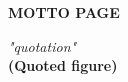 \clearpage
{}
{}

\begin{center}
	\textbf{\large MOTTO PAGE}\\[5em]
\end{center}

\begin{center}
    \textit{"quotation"} \\
    \textbf{(Quoted figure)} \\[1cm]
\end{center} 
